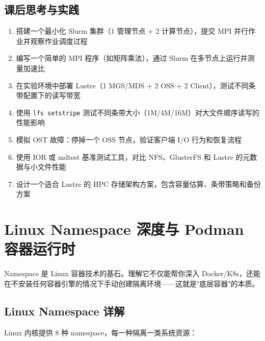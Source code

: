 \documentclass[12pt,UTF8]{ctexbook}
\begin{document}
\section{课后思考与实践}
\label{sec:hpc-practice}
\begin{enumerate}
    \item 搭建一个最小化 Slurm 集群（1 管理节点 + 2 计算节点），提交 MPI 并行作业并观察作业调度过程
    \item 编写一个简单的 MPI 程序（如矩阵乘法），通过 Slurm 在多节点上运行并测量加速比
    \item 在实验环境中部署 Lustre（1 MGS/MDS + 2 OSS + 2 Client），测试不同条带配置下的读写带宽
    \item 使用 \texttt{lfs setstripe} 测试不同条带大小（1M/4M/16M）对大文件顺序读写的性能影响
    \item 模拟 OST 故障：停掉一个 OSS 节点，验证客户端 I/O 行为和恢复流程
    \item 使用 IOR 或 mdtest 基准测试工具，对比 NFS、GlusterFS 和 Lustre 的元数据与小文件性能
    \item 设计一个适合 Lustre 的 HPC 存储架构方案，包含容量估算、条带策略和备份方案
\end{enumerate}

\chapter{Linux Namespace 深度与 Podman 容器运行时}
\label{chap:namespace-podman}

Namespace 是 Linux 容器技术的基石。理解它不仅能帮你深入 Docker/K8s，还能在不安装任何容器引擎的情况下手动创建隔离环境——这就是"底层容器"的本质。

\section{Linux Namespace 详解}
\label{sec:linux-namespaces}

Linux 内核提供 8 种 namespace，每一种隔离一类系统资源：
\end{document}
